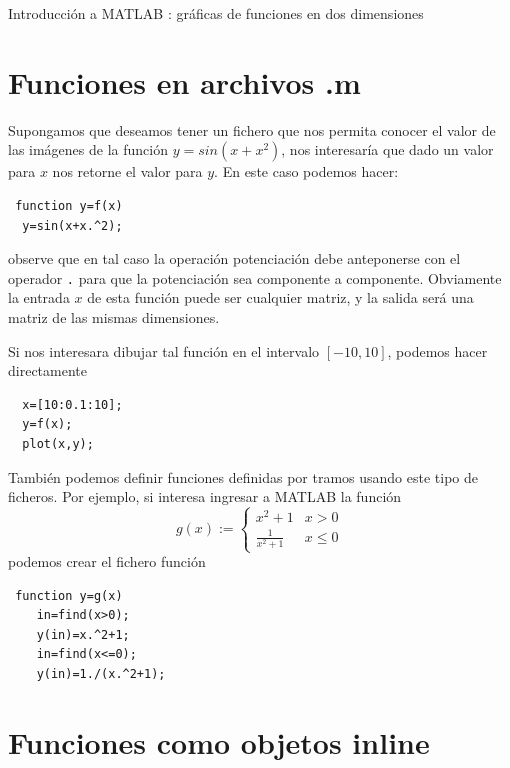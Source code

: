 \documentclass[11pt]{article}
\begin{document}

\centerline{Introducci\'on  a MATLAB \circledR: gr\'aficas de funciones en dos dimensiones} 
%

\section{Funciones en archivos .m}
Supongamos que deseamos tener un fichero que nos permita conocer el valor de las im\'agenes de la funci\'on 
$y=sin(x+x^2)$, nos interesar\'ia que dado un valor para $x$ nos retorne el valor para $y$. En este caso podemos hacer:
\begin{verbatim}
 function y=f(x)
  y=sin(x+x.^2);
\end{verbatim}
observe que en tal caso la operaci\'on potenciaci\'on debe anteponerse con el operador \texttt{.} para que la 
potenciaci\'on sea componente a componente. Obviamente la entrada $x$ de esta funci\'on puede ser cualquier matriz, y 
la salida ser\'a una matriz de las mismas dimensiones.

Si nos interesara dibujar tal funci\'on en el intervalo $[-10,10]$, podemos hacer 
directamente
\begin{verbatim}
  x=[10:0.1:10];
  y=f(x);
  plot(x,y);
\end{verbatim}

Tambi\'en podemos definir funciones definidas por tramos usando este tipo de ficheros. Por ejemplo, si 
interesa ingresar a MATLAB la funci\'on 
$$
g(x):=\begin{cases}
       x^2+1 		&  x>0	\\
       \frac{1}{x^2+1} & x\leq 0
      \end{cases}
$$
podemos crear el fichero funci\'on
\begin{verbatim}
 function y=g(x)
    in=find(x>0);
    y(in)=x.^2+1;
    in=find(x<=0);
    y(in)=1./(x.^2+1);
\end{verbatim}

\section{Funciones como objetos inline}
\end{document}

